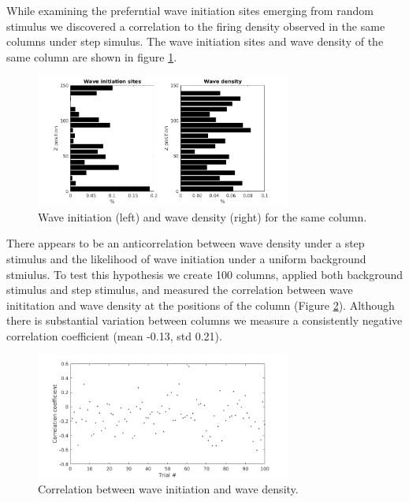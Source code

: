 \documentclass[a4paper,11pt]{article}
\begin{document}
While examining the preferntial wave initiation sites emerging from random stimulus we discovered a correlation to the firing density observed in the same columns under step simulus.
The wave initiation sites and wave density of the same column are shown in figure \ref{fig:initiation_density}.
\begin{figure}[!htb]
 \caption{Wave initiation (left) and wave density (right) for the same column.}
 \label{fig:initiation_density}
 \centering
   \includegraphics[width=0.75\textwidth]{fig/InitiationCorrelationHistogram}
\end{figure}
There appears to be an anticorrelation between wave density under a step stimulus and the likelihood of wave initiation under a uniform background stmiulus.
To test this hypothesis we create 100 columns, applied both background stimulus and step stimulus, and measured the correlation between wave inititation and wave density at the positions of the column (Figure \ref{fig:initiation_density_corr}).
Although there is substantial variation between columns we measure a consistently negative correlation coefficient (mean -0.13, std 0.21).
\begin{figure}[!htb]
 \caption{Correlation between wave initiation and wave density.}
 \label{fig:initiation_density_corr}
 \centering
   \includegraphics[width=0.75\textwidth]{fig/InitiationCorrelation}
\end{figure}
\end{document}
